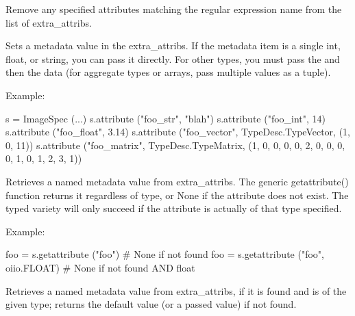 Remove any specified attributes matching the regular expression {\cf name}
from the list of extra_attribs.
\apiend

Sets a metadata value in the {\cf extra_attribs}.  If the metadata item
is a single {\cf int}, {\cf float}, or {\cf string}, you can pass it
directly. For other types, you must pass the \TypeDesc and then the
data (for aggregate types or arrays, pass multiple values as a tuple).

\noindent Example:
\begin{code}
    s = ImageSpec (...)
    s.attribute ("foo_str", "blah")
    s.attribute ("foo_int", 14)
    s.attribute ("foo_float", 3.14)
    s.attribute ("foo_vector", TypeDesc.TypeVector, (1, 0, 11))
    s.attribute ("foo_matrix", TypeDesc.TypeMatrix,
                 (1, 0, 0, 0, 0, 2, 0, 0, 0, 0, 1, 0, 1, 2, 3, 1))
\end{code}
\apiend

Retrieves a named metadata value from {\cf extra_attribs}.  The generic
{\cf getattribute()} function returns it regardless of type, or {\cf None}
if the attribute does not exist.  The typed variety will only succeed
if the attribute is actually of that type specified.

\noindent Example:
\begin{code}
    foo = s.getattribute ("foo")   # None if not found
    foo = s.getattribute ("foo", oiio.FLOAT)  # None if not found AND float
\end{code}
\apiend

Retrieves a named metadata value from {\cf extra_attribs}, if it is
found and is of the given type; returns the default value (or a passed
value) if not found.

